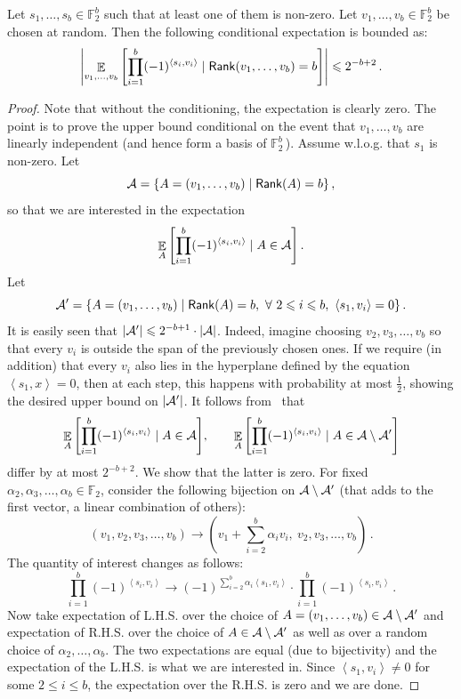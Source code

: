 \documentclass{toc}
\newcommand\Expect[2]{{\mathop{\mathbb{E}}_{#1}\left[ {#2} \right]}}
\renewcommand\leq{\leqslant}
\begin{document}
\begin{lemma}\label{lemma:basis_exp}
Let $s_1, \ldots, s_b \in {\mathbb F}_2^b$ such that at least one of them is non-zero. Let $v_1, \ldots, v_b \in {\mathbb F}_2^b$ be chosen
at random. Then the following conditional expectation is bounded as:
$$ \left| \Expect{v_1,\ldots,v_b}{\prod_{i=1}^b (-1)^{\left<s_i, v_i \right> }
\mid {\sf Rank}(v_1,\ldots,v_b)=b }\right|  \leq
  2^{-b+2}\,.$$%
\end{lemma}
\begin{proof} Note that without the conditioning, the expectation is clearly zero. The point is to prove the upper bound conditional on the event that
$v_1, \ldots, v_b$ are linearly independent
(and hence form a basis of ${\mathbb F}_2^b\,$). %
Assume w.l.o.g. that $s_1$ is non-zero. Let
 $$ {\cal A}  = \{ A =  (v_1, \ldots, v_b) \mid {\sf Rank} (A) = b \}\,,$$%
so that we are interested in the expectation
 $$   \Expect{A}{\prod_{i=1}^b (-1)^{\left<s_i, v_i \right> } \mid A \in {\cal A} }\,.  $$%
 Let
 $$ {\cal A'}  = \{ A =  (v_1, \ldots, v_b) \mid {\sf Rank} (A) = b, ~\forall ~2 \leq i \leq b, ~\left<  s_1, v_i \right> = 0 \}\,.$$%
It is easily seen that $|{\cal A}'| \leq 2^{-b+1} \cdot |{\cal A}|$.
Indeed, %
imagine choosing $v_2, v_3, \ldots, v_b$ so that every $v_i$ is outside
the span of the previously chosen ones. If we require (in addition) that every $v_i$ also lies in
the hyperplane defined by the equation
$\left< s_1, x \right> = 0$, then at each step,
this happens with probability at most $\frac{1}{2}$, showing the desired upper bound on
$|{\cal A}'|$.
It follows from~ that
%
$$ \Expect{A}{\prod_{i=1}^b (-1)^{\left<s_i, v_i \right> } \mid A \in {\cal A} }, \quad  \quad
\Expect{A}{\prod_{i=1}^b (-1)^{\left<s_i, v_i \right> } \mid A \in {\cal A}\setminus {\cal A}' } $$
differ by at most $2^{-b+2}$.  %
%
We show that the latter is zero. For fixed $\alpha_2, \alpha_3,\ldots, \alpha_b \in {\mathbb F}_2$,
consider the following bijection on $ {\cal A}\setminus {\cal A}' $ (that adds to the first vector, a linear combination of others):
  $$  (v_1, v_2, v_3, \ldots, v_b)  \to   (v_1 + \sum_{i=2}^b \alpha_i v_i, ~v_2, v_3, \ldots, v_b)\,. $$%
 The quantity of interest changes as follows:
  $$ \prod_{i=1}^b (-1)^{\left<s_i, v_i \right> }   \to   (-1)^{ \sum_{i=2}^b \alpha_i \left< s_1, v_i\right>} \cdot   \prod_{i=1}^b (-1)^{\left<s_i, v_i \right> }\,. $$%
Now take expectation of L.H.S. over the choice of $A = (v_1,\ldots,v_b)  \in {\cal A}\setminus {\cal A}'$ and expectation of R.H.S. over
the choice of $A  \in {\cal A}\setminus {\cal A}'$
as well as over a random choice of  $\alpha_2, \ldots, \alpha_b$. The two expectations are equal (due to bijectivity)
and the expectation of the L.H.S. is what we are interested in.
Since $ \left< s_1, v_i\right> \neq 0$ for some $2 \leq i \leq b$, the expectation over the R.H.S. is zero and we are done.
\end{proof}
\end{document}
